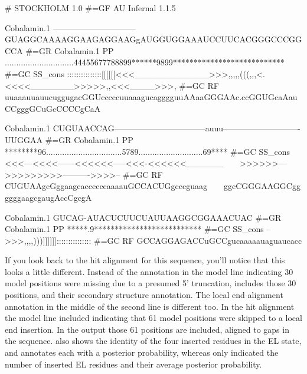 
\label{cmalign-cobalamin}
\begin{sreoutput}
# STOCKHOLM 1.0
#=GF AU Infernal 1.1.5

Cobalamin.1         ------------------------------GUAGGCAAAAGGAAGAGGAAGgAUGGUGGAAAUCCUUCACGGGCCCGGCCA
#=GR Cobalamin.1 PP ..............................44455677788899******9899***************************
#=GC SS_cons        :::::::::::::::[[[[[[<<<____________>>>,,,,,(((,,,<.<<<<_______>>>>>,,<<<____>>>,
#=GC RF             uuaaauuauucuggugacGGUcccccuuaaagucagggguuAAaaGGGAAc.ccGGUGcaAauCCgggGCuGcCCCCgCaA


Cobalamin.1         CUGUAACCAG---------------------------------auuu----------------------------UUGGAA
#=GR Cobalamin.1 PP ********96.................................5789............................69****
#=GC SS_cons        <<<---<<<<------<<<<<<-----<<<-<<<<<<______~~~~>>>>>>--->>>>>>>>>---------->>>>--
#=GC RF             CUGUAAgcGggaagcaccccccaaaauGCCACUGgcccguaag~~~~ggcCGGGAAGGCggggggaagcgaugAccCgcgA


Cobalamin.1         GUCAG-AUACUCUUCUAUUAAGGCGGAAACUAC
#=GR Cobalamin.1 PP *****.9**************************
#=GC SS_cons        -->>>,,,,)))]]]]]]:::::::::::::::
#=GC RF             GCCAGGAGACCuGCCgucaaaaauaguaucacc

\end{sreoutput}

If you look back to the  hit alignment for this sequence,
you'll notice that this looks a little different. Instead of the
\otext{<[30]*} annotation in the model line indicating 30 model
positions were missing due to a presumed 5' truncation, 
includes those 30 positions, and their secondary structure
annotation. The local end alignment annotation in the middle of the
second line is different too. In the  hit alignment the
model line included \otext{*[61]*} indicating that 61 model positions
were skipped to a local end insertion. In the  output
those 61 positions are included, aligned to gaps in the sequence. 
 also shows the identity of the four inserted residues
in the EL state, and annotates each with a posterior probability,
whereas  only indicated the number of inserted EL
residues and their average posterior probability. 

